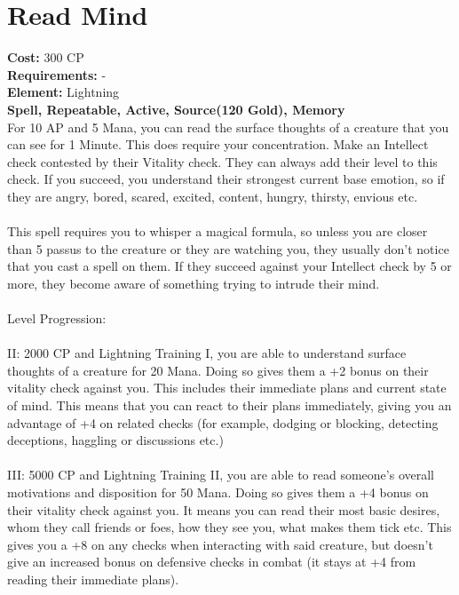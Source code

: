 \section{Read Mind}
\textbf{Cost:} 300 CP\\
\textbf{Requirements:} -\\
\textbf{Element:} Lightning\\
\textbf{Spell, Repeatable, Active, Source(120 Gold), Memory}\\
For 10 AP and 5 Mana, you can read the surface thoughts of a creature that you can see for 1 Minute. This does require your concentration. Make an Intellect check contested by their Vitality check. They can always add their level to this check. If you succeed, you understand their strongest current base emotion, so if they are angry, bored, scared, excited, content, hungry, thirsty, envious etc.\\
\\
This spell requires you to whisper a magical formula, so unless you are closer than 5 passus to the creature or they are watching you, they usually don't notice that you cast a spell on them. If they succeed against your Intellect check by 5 or more, they become aware of something trying to intrude their mind.\\
\\
Level Progression:\\
\\
II: 2000 CP and Lightning Training I, you are able to understand surface thoughts of a creature for 20 Mana. Doing so gives them a +2 bonus on their vitality check against you. This includes their immediate plans and current state of mind. This means that you can react to their plans immediately, giving you an advantage of +4 on related checks (for example, dodging or blocking, detecting deceptions, haggling or discussions etc.)\\
\\
III: 5000 CP and Lightning Training II, you are able to read someone's overall motivations and disposition for 50 Mana. Doing so gives them a +4 bonus on their vitality check against you. It means you can read their most basic desires, whom they call friends or foes, how they see you, what makes them tick etc. This gives you a +8 on any checks when interacting with said creature, but doesn't give an increased bonus on defensive checks in combat (it stays at +4 from reading their immediate plans).\\